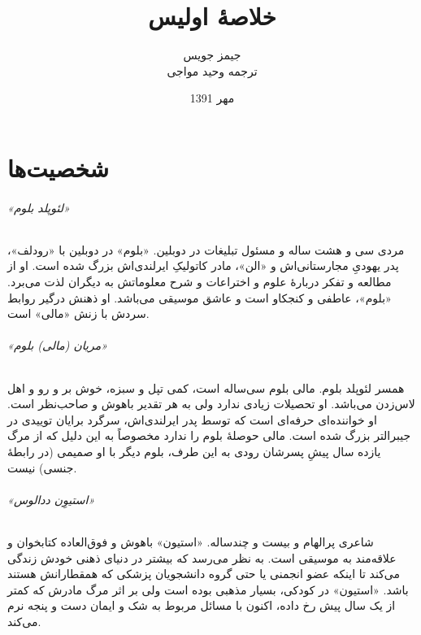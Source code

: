 \documentclass[12pt]{book}
\newcommand{\noun}[1]{«{#1}»}
\begin{document}
    \title{خلاصۀ اولیس }
    \author{جیمز جویس\\
    ترجمه وحید مواجی
    }
    \date{مهر 1391}
    \frontmatter                            %
    \maketitle                              %
    \tableofcontents                        %
    \mainmatter


    \part{شخصیت‌ها}
    \paragraph{\noun{لئوپلد بلوم}\protect{}}
    مردی سی و هشت ساله و مسئول تبلیغات در دوبلین. \noun{بلوم} در دوبلین با \noun{رودلف}، پدر یهودیِ مجارستانی‌اش‌ و \noun{الن}، مادر کاتولیکِ ایرلندی‌اش بزرگ شده است. او از مطالعه و تفکر دربارۀ علوم و اختراعات و شرح معلوماتش به دیگران لذت می‌برد. \noun{بلوم}، عاطفی و کنجکاو است و عاشق موسیقی می‌باشد. او ذهنش درگیر روابط سردش با زنش \noun{مالی} است.
    \paragraph{\noun{مریان (مالی) بلوم}\protect{}}
    همسر لئوپلد بلوم. مالی بلوم سی‌ساله است، کمی تپل و سبزه، خوش بر و رو و اهل لاس‌زدن می‌باشد. او تحصیلات زیادی ندارد ولی به هر تقدیر باهوش و صاحب‌نظر است. او خواننده‌ای حرفه‌ای است که توسط پدر ایرلندی‌اش، سرگرد برایان توییدی در جیبرالتر بزرگ شده است. مالی حوصلۀ بلوم را ندارد مخصوصاً به این دلیل که از مرگ یازده سال پیشِ پسرشان رودی به این طرف، بلوم دیگر با او صمیمی (در رابطۀ جنسی) نیست.
    \paragraph{\noun{استیوِن ددالوس}\protect{}}
    شاعری پرالهام و بیست و چندساله. \noun{استیون} باهوش و فوق‌العاده کتابخوان و علاقه‌مند به موسیقی است. به نظر می‌رسد که بیشتر در دنیای ذهنی خودش زندگی می‌کند تا اینکه عضو انجمنی یا حتی گروه دانشجویان پزشکی که همقطارانش هستند باشد. \noun{استیون} در کودکی، بسیار مذهبی بوده است ولی بر اثر مرگ مادرش که کمتر از یک سال پیش رخ داده، اکنون با مسائل مربوط به شک و ایمان دست و پنجه نرم می‌کند.
\end{document}
